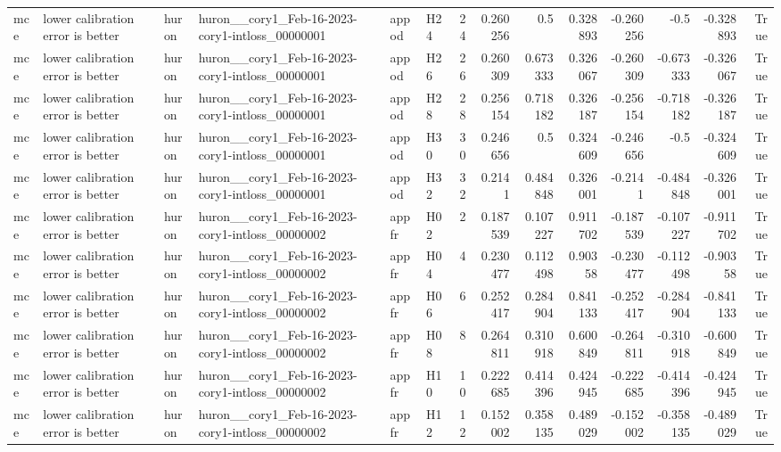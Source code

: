 \begin{longtable}{llllllrrrrrrrr}
mce & lower calibration error is better & huron & huron\_\_cory1\_Feb-16-2023-cory1-intloss\_00000001 & appod & H24 & 24 & 0.260256 & 0.5 & 0.328893 & -0.260256 & -0.5 & -0.328893 & True \\
mce & lower calibration error is better & huron & huron\_\_cory1\_Feb-16-2023-cory1-intloss\_00000001 & appod & H26 & 26 & 0.260309 & 0.673333 & 0.326067 & -0.260309 & -0.673333 & -0.326067 & True \\
mce & lower calibration error is better & huron & huron\_\_cory1\_Feb-16-2023-cory1-intloss\_00000001 & appod & H28 & 28 & 0.256154 & 0.718182 & 0.326187 & -0.256154 & -0.718182 & -0.326187 & True \\
mce & lower calibration error is better & huron & huron\_\_cory1\_Feb-16-2023-cory1-intloss\_00000001 & appod & H30 & 30 & 0.246656 & 0.5 & 0.324609 & -0.246656 & -0.5 & -0.324609 & True \\
mce & lower calibration error is better & huron & huron\_\_cory1\_Feb-16-2023-cory1-intloss\_00000001 & appod & H32 & 32 & 0.2141 & 0.484848 & 0.326001 & -0.2141 & -0.484848 & -0.326001 & True \\
mce & lower calibration error is better & huron & huron\_\_cory1\_Feb-16-2023-cory1-intloss\_00000002 & appfr & H02 & 2 & 0.187539 & 0.107227 & 0.911702 & -0.187539 & -0.107227 & -0.911702 & True \\
mce & lower calibration error is better & huron & huron\_\_cory1\_Feb-16-2023-cory1-intloss\_00000002 & appfr & H04 & 4 & 0.230477 & 0.112498 & 0.90358 & -0.230477 & -0.112498 & -0.90358 & True \\
mce & lower calibration error is better & huron & huron\_\_cory1\_Feb-16-2023-cory1-intloss\_00000002 & appfr & H06 & 6 & 0.252417 & 0.284904 & 0.841133 & -0.252417 & -0.284904 & -0.841133 & True \\
mce & lower calibration error is better & huron & huron\_\_cory1\_Feb-16-2023-cory1-intloss\_00000002 & appfr & H08 & 8 & 0.264811 & 0.310918 & 0.600849 & -0.264811 & -0.310918 & -0.600849 & True \\
mce & lower calibration error is better & huron & huron\_\_cory1\_Feb-16-2023-cory1-intloss\_00000002 & appfr & H10 & 10 & 0.222685 & 0.414396 & 0.424945 & -0.222685 & -0.414396 & -0.424945 & True \\
mce & lower calibration error is better & huron & huron\_\_cory1\_Feb-16-2023-cory1-intloss\_00000002 & appfr & H12 & 12 & 0.152002 & 0.358135 & 0.489029 & -0.152002 & -0.358135 & -0.489029 & True \\

\end{longtable}
